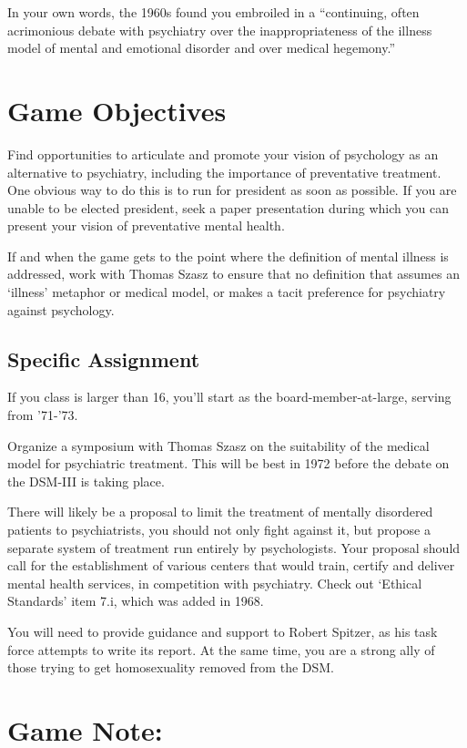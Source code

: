 \begin{refsection}
In your own words, the 1960s found you embroiled in a ``continuing, often acrimonious debate with psychiatry over the inappropriateness of the illness model of mental and emotional disorder and over medical hegemony.''

\section{Game Objectives}
\label{gameobjectives}

Find opportunities to articulate and promote your vision of psychology as an alternative to psychiatry, including the importance of preventative treatment. One obvious way to do this is to run for president as soon as possible. If you are unable to be elected president, seek a paper presentation during which you can present your vision of preventative mental health.

If and when the game gets to the point where the definition of mental illness is addressed, work with Thomas Szasz to ensure that no definition that assumes an `illness' metaphor or medical model, or makes a tacit preference for psychiatry against psychology.

\subsection{Specific Assignment}
\label{specificassignment}

If you class is larger than 16, you'll start as the board-member-at-large, serving from '71-'73.

Organize a symposium with Thomas Szasz on the suitability of the medical model for psychiatric treatment. This will be best in 1972 before the debate on the DSM-III is taking place.

There will likely be a proposal to limit the treatment of mentally disordered patients to psychiatrists, you should not only fight against it, but propose a separate system of treatment run entirely by psychologists. Your proposal should call for the establishment of various centers that would train, certify and deliver mental health services, in competition with psychiatry. Check out `Ethical Standards' item 7.i, which was added in 1968.

You will need to provide guidance and support to Robert Spitzer, as his task force attempts to write its report. At the same time, you are a strong ally of those trying to get homosexuality removed from the DSM.

\section{Game Note:}
\label{gamenote:}


\end{refsection}
